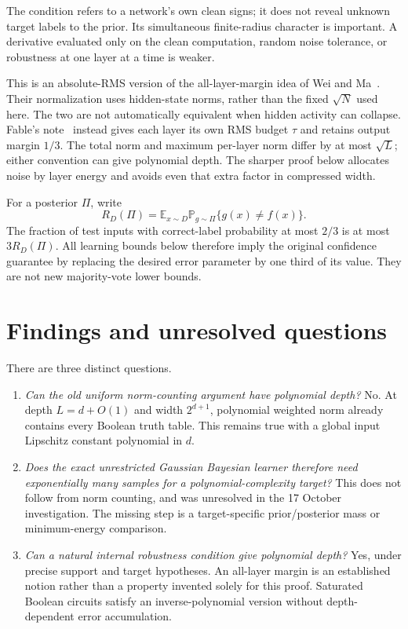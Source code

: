 \documentclass[11pt]{article}
\newcommand{\E}{\mathbb E}
\newcommand{\Pp}{\mathbb P}
\begin{document}
The condition refers to a network's own clean signs; it does not reveal
unknown target labels to the prior. Its simultaneous finite-radius character
is important. A derivative evaluated only on the clean computation, random
noise tolerance, or robustness at one layer at a time is weaker.

This is an absolute-RMS version of the all-layer-margin idea of Wei and
Ma~\cite{weima2020}. Their normalization uses hidden-state norms, rather than
the fixed $\sqrt N$ used here. The two are not automatically equivalent when
hidden activity can collapse. Fable's note~\cite{fable} instead gives each layer
its own RMS budget $\tau$ and retains output margin $1/3$. The total norm and
maximum per-layer norm differ by at most $\sqrt L$; either convention can
give polynomial depth. The sharper proof below allocates noise by layer
energy and avoids even that extra factor in compressed width.

For a posterior $\Pi$, write
\[
 R_D(\Pi)=\E_{x\sim D}\Pp_{g\sim\Pi}\{g(x)\ne f(x)\}.
\]
The fraction of test inputs with correct-label probability at most $2/3$ is
at most $3R_D(\Pi)$. All learning bounds below therefore imply the original
confidence guarantee by replacing the desired error parameter by one third
of its value. They are not new majority-vote lower bounds.

\section{Findings and unresolved questions}

There are three distinct questions.
\begin{enumerate}
\item \emph{Can the old uniform norm-counting argument have polynomial depth?}
No. At depth $L=d+O(1)$ and width $2^{d+1}$, polynomial weighted norm already
contains every Boolean truth table. This remains true with a global input
Lipschitz constant polynomial in $d$.
\item \emph{Does the exact unrestricted Gaussian Bayesian learner therefore
need exponentially many samples for a polynomial-complexity target?}
This does not follow from norm counting, and was unresolved in the
17 October investigation. The missing
step is a target-specific prior/posterior mass or minimum-energy comparison.
\item \emph{Can a natural internal robustness condition give polynomial depth?}
Yes, under precise support and target hypotheses. An all-layer margin is an
established notion rather than a property invented solely for this proof.
Saturated Boolean circuits satisfy an inverse-polynomial version without
depth-dependent error accumulation.
\end{enumerate}
\end{document}
